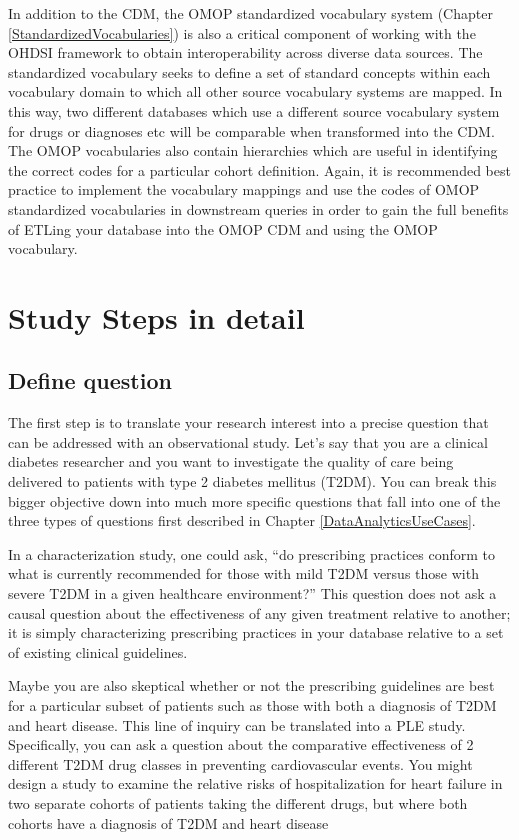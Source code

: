\documentclass[11pt]{book}
\theoremstyle{definition}
\theoremstyle{definition}
\theoremstyle{definition}
\theoremstyle{remark}
\begin{document}
In addition to the CDM, the OMOP standardized vocabulary system (Chapter \ref{StandardizedVocabularies}) is also a critical component of working with the OHDSI framework to obtain interoperability across diverse data sources. The standardized vocabulary seeks to define a set of standard concepts within each vocabulary domain to which all other source vocabulary systems are mapped. In this way, two different databases which use a different source vocabulary system for drugs or diagnoses etc will be comparable when transformed into the CDM. The OMOP vocabularies also contain hierarchies which are useful in identifying the correct codes for a particular cohort definition. Again, it is recommended best practice to implement the vocabulary mappings and use the codes of OMOP standardized vocabularies in downstream queries in order to gain the full benefits of ETLing your database into the OMOP CDM and using the OMOP vocabulary.

\hypertarget{study-steps-in-detail}{%
\section{Study Steps in detail}\label{study-steps-in-detail}}

\hypertarget{define-question}{%
\subsection{Define question}\label{define-question}}

The first step is to translate your research interest into a precise question that can be addressed with an observational study. Let's say that you are a clinical diabetes researcher and you want to investigate the quality of care being delivered to patients with type 2 diabetes mellitus (T2DM). You can break this bigger objective down into much more specific questions that fall into one of the three types of questions first described in Chapter \ref{DataAnalyticsUseCases}.

In a characterization study, one could ask, ``do prescribing practices conform to what is currently recommended for those with mild T2DM versus those with severe T2DM in a given healthcare environment?'' This question does not ask a causal question about the effectiveness of any given treatment relative to another; it is simply characterizing prescribing practices in your database relative to a set of existing clinical guidelines.

Maybe you are also skeptical whether or not the prescribing guidelines are best for a particular subset of patients such as those with both a diagnosis of T2DM and heart disease. This line of inquiry can be translated into a PLE study. Specifically, you can ask a question about the comparative effectiveness of 2 different T2DM drug classes in preventing cardiovascular events. You might design a study to examine the relative risks of hospitalization for heart failure in two separate cohorts of patients taking the different drugs, but where both cohorts have a diagnosis of T2DM and heart disease
\end{document}
